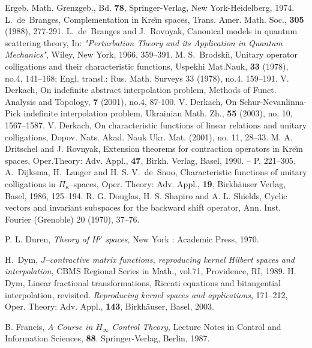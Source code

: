 \documentclass[12pt,twoside,a4paper]{amsart}
\theoremstyle{definition}
\numberwithin{equation}{section}
\begin{document}
\begin{thebibliography}{ArovD97}
        Ergeb. Math. Grenzgeb., Bd. {\bf 78}, Springer-Verlag,
        New York-Heidelberg, 1974.
    L.~de~Branges,
    Complementation in Kre\u{\i}n spaces, Trans. Amer. Math. Soc.,
    {\bf 305} (1988), 277-291.
    L.~de~Branges and J.~Rovnyak,
    Canonical models in quantum scattering theory,
    In: \textit{"Perturbation Theory and its Application in Quantum Mechanics"},
    Wiley, New York, 1966, 359--391.
    M. S.~Brodski\u{\i},
    Unitary operator colligations and their characteristic functions,
    Uspekhi Mat.Nauk, {\bf 33}  (1978),  no.4, 141--168;
    Engl. transl.: Rus. Math. Surveys 33  (1978),  no.4, 159--191.
        V. Derkach,
        On indefinite abstract interpolation problem,
        Methods of Funct. Analysis and Topology, {\bf 7} (2001), no.4, 87-100.
        V. Derkach,
        On Schur-Nevanlinna-Pick indefinite interpolation problem,
       Ukrainian Math. Zh.,  {\bf 55} (2003), no. 10, 1567--1587.
V. Derkach, On characteristic functions of linear relations and unitary
colligations,
Dopov. Nats. Akad. Nauk Ukr. Mat.  (2001),  no. 11, 28--33.
        M. A. Dritschel and J. Rovnyak, Extension theorems for contraction
        operators in Kre\u{\i}n spaces, Oper.Theory: Adv. Appl., {\bf 47},
        Birkh. Verlag, Basel, 1990. -- P. 221--305.
        A.~Dijksma, H.~Langer and  H. S. V.~de~Snoo,
        Characteristic functions of unitary colligations in
    $\Pi_\kappa$--spaces, Oper. Theory: Adv. Appl., {\bf 19},
        Birkh\"auser Verlag, Basel, 1986, 125--194.
    R. G. Douglas,  H. S. Shapiro and A. L.  Shields, Cyclic vectors and
invariant subspaces for the backward shift operator,
    Ann. Inst. Fourier (Grenoble)  20  (1970), 37--76.

 P. L. Duren,    \textit{Theory of $H^p$ spaces},
  New York : Academic Press, 1970.

    H.~Dym,
    \textit{$J$--contractive matrix functions, reproducing kernel
Hilbert spaces and interpolation}, CBMS Regional Series in Math.,
    vol.71, Providence, RI, 1989.
H. Dym, Linear fractional transformations, Riccati equations and bitangential
interpolation, revisited. \textit{Reproducing kernel spaces and applications}, 171--212,
Oper. Theory: Adv. Appl., {\bf 143}, Birkh\"auser, Basel, 2003.

B. Francis,  \textit{ A Course in $H_\infty$ Control Theory}, Lecture Notes in Control
and Information Sciences, {\bf 88}. Springer-Verlag, Berlin, 1987.


\end{thebibliography}
\end{document}
